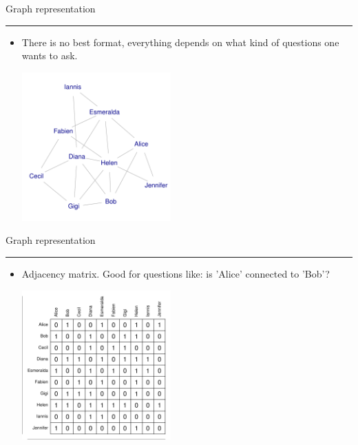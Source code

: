 \documentclass[landscape,fleqno]{foils}
\newcommand{\stitle}[1]{{\color{blue}\Large #1\par\vspace*{10pt}\hrule}}
\newenvironment{narrow}[2]{%
  \begin{list}{}{%
      \setlength{\topsep}{0pt}%
      \setlength{\leftmargin}{#1}%
      \setlength{\rightmargin}{#2}%
      \setlength{\listparindent}{\parindent}%
      \setlength{\itemindent}{\parindent}%
      \setlength{\parsep}{\parskip}}%
    \item[]}{\end{list}}
\begin{document}
\newpage
\stitle{Graph representation}
\begin{narrow}{0cm}{15cm}
\begin{itemize}
\item There is no best format, everything depends on
  what kind of questions one wants to ask.
\begin{center}
\includegraphics[width=0.45\textwidth]{example}
\end{center}
\end{itemize}
\end{narrow}

\newpage
\stitle{Graph representation}
\begin{narrow}{0cm}{15cm}
\begin{itemize}
\item Adjacency matrix. Good for questions like: is 'Alice' connected
  to 'Bob'?
\begin{center}
  \includegraphics[width=0.45\textwidth]{adjacency}
\end{center}
\end{itemize}
\end{narrow}
\end{document}
